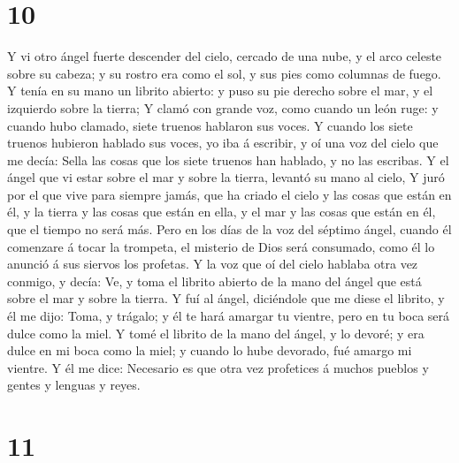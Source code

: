 \hypertarget{section-9}{%
\section{10}\label{section-9}}

 Y vi otro ángel fuerte descender del cielo, cercado de
una nube, y el arco celeste sobre su cabeza; y su rostro era como el
sol, y sus pies como columnas de fuego.  Y tenía en su
mano un librito abierto: y puso su pie derecho sobre el mar, y el
izquierdo sobre la tierra;  Y clamó con grande voz, como
cuando un león ruge: y cuando hubo clamado, siete truenos hablaron sus
voces.  Y cuando los siete truenos hubieron hablado sus
voces, yo iba á escribir, y oí una voz del cielo que me decía: Sella las
cosas que los siete truenos han hablado, y no las escribas.
 Y el ángel que vi estar sobre el mar y sobre la tierra,
levantó su mano al cielo,  Y juró por el que vive para
siempre jamás, que ha criado el cielo y las cosas que están en él, y la
tierra y las cosas que están en ella, y el mar y las cosas que están en
él, que el tiempo no será más.  Pero en los días de la voz
del séptimo ángel, cuando él comenzare á tocar la trompeta, el misterio
de Dios será consumado, como él lo anunció á sus siervos los profetas.
 Y la voz que oí del cielo hablaba otra vez conmigo, y
decía: Ve, y toma el librito abierto de la mano del ángel que está sobre
el mar y sobre la tierra.  Y fuí al ángel, diciéndole que
me diese el librito, y él me dijo: Toma, y trágalo; y él te hará amargar
tu vientre, pero en tu boca será dulce como la miel.  Y
tomé el librito de la mano del ángel, y lo devoré; y era dulce en mi
boca como la miel; y cuando lo hube devorado, fué amargo mi vientre.
 Y él me dice: Necesario es que otra vez profetices á
muchos pueblos y gentes y lenguas y reyes.

\hypertarget{section-10}{%
\section{11}\label{section-10}}

